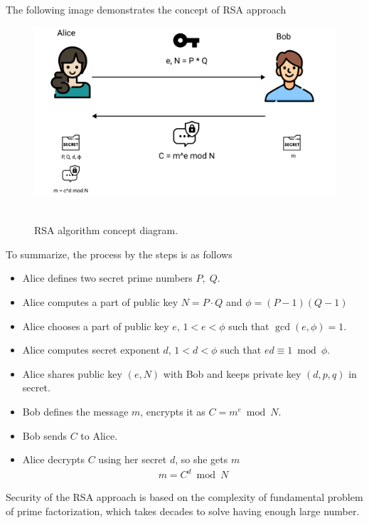 The following image demonstrates the concept of RSA approach
\begin{figure}[H]
    \centering
    \includegraphics[width=1\textwidth]{./img/RSA}
    ~\caption{RSA algorithm concept diagram.}\label{fig:figure8}
\end{figure}
To summarize, the process by the steps is as follows
\begin{itemize}
    \item Alice defines two secret prime numbers $P, \; Q$.
    \item Alice computes a part of public key $N = P \cdot Q$ and $\phi = (P-1)(Q-1)$
    \item Alice chooses a part of public key $e$, $1<e< \phi$ such that $\gcd(e, \phi) = 1$.
    \item Alice computes secret exponent $d$, $1<d< \phi$ such that $ed \equiv 1 \bmod \phi$.
    \item Alice shares public key $(e, N)$ with Bob and keeps private key $(d, p, q)$ in secret.
    \item Bob defines the message $m$, encrypts it as $C = m^{e} \bmod N$.
    \item Bob sends $C$ to Alice.
    \item Alice decrypts $C$ using her secret $d$, so she gets $m$
    \begin{align*}
        m = C^d \bmod N
    \end{align*}
\end{itemize}
Security of the RSA approach is based on the complexity of fundamental problem of prime factorization,
which takes decades to solve having enough large number.
